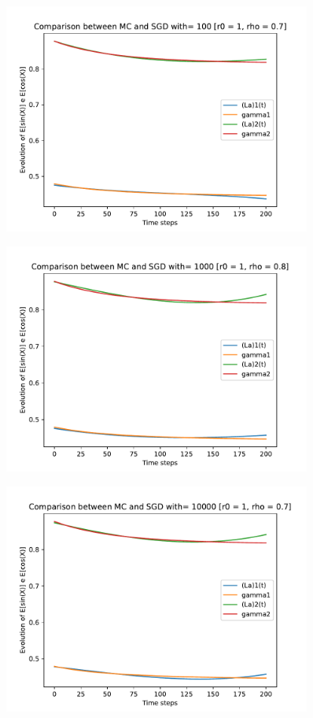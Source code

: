 \documentclass[a4paper,11pt,openright]{report}
\begin{document}
\begin{figure}[H]
\centering
\includegraphics[width=0.9\textwidth]{images/graphs T = 2/n = 3, M = 100 sine and cosine.pdf}
\end{figure}
\begin{figure}[H]
\centering
\includegraphics[width=0.9\textwidth]{images/graphs T = 2/n = 3, M = 1000 sine and cosine.pdf}
\end{figure}
\begin{figure}[H]
\centering
\includegraphics[width=0.9\textwidth]{images/graphs T = 2/n = 3, M = 10000 sine and cosine.pdf}
\end{figure}
\newpage
\end{document}
